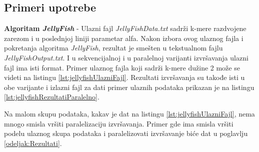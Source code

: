 \documentclass[12pt,oneside]{memoir}
\begin{document}
\subsection{Primeri upotrebe}

\textbf{Algoritam \textit{JellyFish}} - Ulazni fajl \textit{JellyFishData.txt} sadrži k-mere razdvojene zarezom i u poslednjoj liniji parametar alfa. Nakon izbora ovog ulaznog fajla i pokretanja algoritma \textit{JellyFish}, rezultat je smešten u tekstualnom fajlu \textit{JellyFishOutput.txt}. I u sekvencijalnoj i u paralelnoj varijanti izvršavanja ulazni fajl ima isti format. Primer ulaznog fajla koji sadrži k-mere dužine 2 može se videti na listingu \ref{lst:jellyfishUlazniFajl}. Rezultati izvršavanja su takođe isti u obe varijante i izlazni fajl za dati primer ulaznih podataka prikazan je na listingu \ref{lst:jellyfishRezultatiParalelno}.




% 




Na malom skupu podataka, kakav je dat na listingu \ref{lst:jellyfishUlazniFajl}, nema mnogo smisla vršiti paralelizaciju izvršavanja. Primer gde ima smisla vršiti podelu ulaznog skupa podataka i paralelizovati izvršavanje biće dat u poglavlju \ref{odeljak:Rezultati}.
\end{document}
